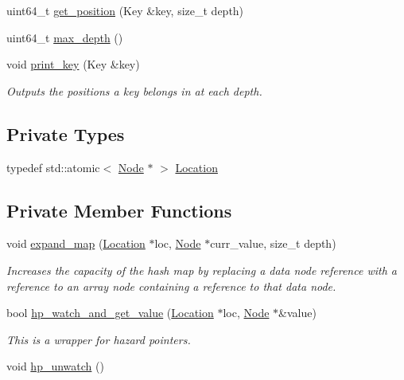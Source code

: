 \begin{DoxyCompactItemize}
\item 
uint64\+\_\+t \hyperlink{classtervel_1_1containers_1_1wf_1_1_hash_map_a8e8d0c8976e57161982b2690429c7a21}{get\+\_\+position} (Key \&key, size\+\_\+t depth)
\item 
uint64\+\_\+t \hyperlink{classtervel_1_1containers_1_1wf_1_1_hash_map_a6612d9ecf9fa6707d6f5f6cc9aa59613}{max\+\_\+depth} ()
\item 
void \hyperlink{classtervel_1_1containers_1_1wf_1_1_hash_map_aef0328afe3b270b14f6345e76aff9ef7}{print\+\_\+key} (Key \&key)
\begin{DoxyCompactList}\small\item\em Outputs the positions a key belongs in at each depth. \end{DoxyCompactList}\end{DoxyCompactItemize}
\subsection*{Private Types}
\begin{DoxyCompactItemize}
\item 
typedef std\+::atomic$<$ \hyperlink{classtervel_1_1containers_1_1wf_1_1_hash_map_1_1_node}{Node} $\ast$ $>$ \hyperlink{classtervel_1_1containers_1_1wf_1_1_hash_map_ab2c04cbf19034689a795208e0108fe8a}{Location}
\end{DoxyCompactItemize}
\subsection*{Private Member Functions}
\begin{DoxyCompactItemize}
\item 
void \hyperlink{classtervel_1_1containers_1_1wf_1_1_hash_map_a16ae6d201452512192fdca6e2edfb103}{expand\+\_\+map} (\hyperlink{classtervel_1_1containers_1_1wf_1_1_hash_map_ab2c04cbf19034689a795208e0108fe8a}{Location} $\ast$loc, \hyperlink{classtervel_1_1containers_1_1wf_1_1_hash_map_1_1_node}{Node} $\ast$curr\+\_\+value, size\+\_\+t depth)
\begin{DoxyCompactList}\small\item\em Increases the capacity of the hash map by replacing a data node reference with a reference to an array node containing a reference to that data node. \end{DoxyCompactList}\item 
bool \hyperlink{classtervel_1_1containers_1_1wf_1_1_hash_map_ad20d1a66ecbec92076502223116708e4}{hp\+\_\+watch\+\_\+and\+\_\+get\+\_\+value} (\hyperlink{classtervel_1_1containers_1_1wf_1_1_hash_map_ab2c04cbf19034689a795208e0108fe8a}{Location} $\ast$loc, \hyperlink{classtervel_1_1containers_1_1wf_1_1_hash_map_1_1_node}{Node} $\ast$\&value)
\begin{DoxyCompactList}\small\item\em This is a wrapper for hazard pointers. \end{DoxyCompactList}\item 
void \hyperlink{classtervel_1_1containers_1_1wf_1_1_hash_map_aa69a1e4365aa684f19af2b98fe0a663a}{hp\+\_\+unwatch} ()
\end{DoxyCompactItemize}
